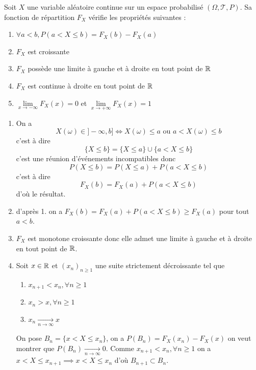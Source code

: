 \documentclass[a4paper,12pt]{article}
\begin{document}
\begin{proposition}{}{}
    Soit $X$ une variable aléatoire continue sur un espace probabilisé $(\Omega, \mathcal{T}, P)$.
    Sa fonction de répartition $F_X$ vérifie les propriétés suivantes :
    \begin{enumerate}
        \item $\forall a < b, P(a < X \leq b) = F_X(b) - F_X(a)$
        \item $F_X$ est croissante
        \item $F_X$ possède une limite à gauche et à droite en tout point de $\mathbb{R}$
        \item $F_X$ est continue à droite en tout point de $\mathbb{R}$
        \item $\lim\limits_{x \to -\infty} F_X(x) = 0$ et $\lim\limits_{x \to +\infty} F_X(x) = 1$
    \end{enumerate}
\end{proposition}

\begin{demonstration}
    \begin{enumerate}
        \item On a
        $$
        X(\omega) \in ]-\infty, b] \iff X(\omega) \leq a \text{ ou } a < X(\omega) \leq b
        $$
        c'est à dire
        $$
        \{ X \leq b \} = \{ X \leq a \} \cup \{ a < X \leq b \}
        $$
        c'est une réunion d'événements incompatibles donc
        $$
        P(X \leq b) = P(X \leq a) + P(a < X \leq b)
        $$
        c'est à dire
        $$
        F_X(b) = F_X(a) + P(a < X \leq b)
        $$
        d'où le résultat.
        \item d'après 1. on a $F_X(b) = F_X(a) + P(a < X \leq b) \geq F_X(a)$ pour tout $a < b$.
        \item $F_X$ est monotone croissante donc elle admet une limite à gauche et à droite en tout point de $\mathbb{R}$.
        \item Soit $x \in \mathbb{R}$ et $(x_n)_{n \geq 1}$ une suite strictement décroissante tel que
        
        \begin{enumerate}[label=\roman*.]
            \item $x_{n+1} < x_n, \forall n \geq 1$
            \item $x_n > x, \forall n \geq 1$
            \item $x_n \underset{n \to \infty}{\to} x$
        \end{enumerate}
        On pose $B_n = \{x < X \leq x_n\}$, on a $P(B_n) = F_X(x_n) - F_X(x)$
        on veut montrer que $P(B_n) \underset{n \to \infty}{\to} 0$.
        Comme $x_{n+1} < x_n, \forall n \geq 1$ on a $x < X \leq x_{n+1} \implies x < X \leq x_n$
        d'où $B_{n+1} \subset B_n$.
    \end{enumerate}
\end{demonstration}
\end{document}
